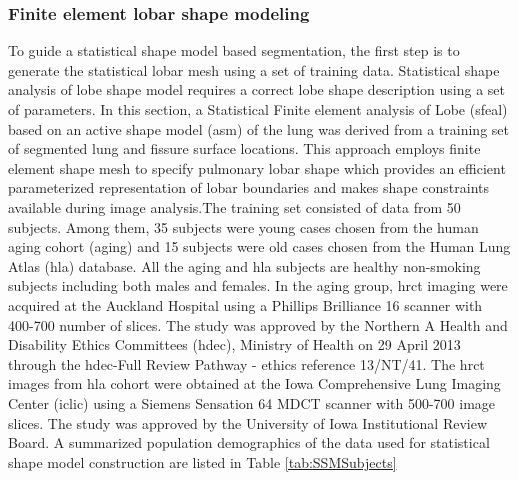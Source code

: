 \subsubsection{Finite element lobar shape modeling} 

To guide a statistical shape model based segmentation, the first step is to generate the statistical lobar mesh using a set of training data. Statistical shape analysis of lobe shape model requires a correct lobe shape description using a set of parameters. In this section, a Statistical Finite element analysis of Lobe (\gls{sfeal}) based on an active shape model (\gls{asm}) \citep{cootes1995active} of the lung was derived from a training set of segmented lung and fissure surface locations. This approach employs finite element shape mesh to specify pulmonary lobar shape which provides an efficient parameterized representation of lobar boundaries and makes shape constraints available during image analysis.The training set consisted of data from 50 subjects. Among them, 35 subjects were young cases chosen from the human aging cohort (\gls{aging}) and 15 subjects were old cases chosen from the Human Lung Atlas (\gls{hla}) database. All the \gls{aging} and \gls{hla} subjects are healthy non-smoking subjects including both males and females. In the \gls{aging} group, \gls{hrct} imaging were acquired at the Auckland Hospital using a Phillips Brilliance 16 scanner with 400-700 number of slices. The study was approved by the Northern A Health and Disability Ethics Committees (\gls{hdec}), Ministry of Health on 29 April 2013 through the \gls{hdec}-Full Review Pathway - ethics reference 13/NT/41. The \gls{hrct} images from \gls{hla} cohort were obtained at the Iowa Comprehensive Lung Imaging Center (\gls{iclic}) using a Siemens Sensation 64 MDCT scanner with 500-700 image slices. The study was approved by the University of Iowa Institutional Review Board. A summarized population demographics of the data used for statistical shape model construction are listed in Table \ref{tab:SSMSubjects}

